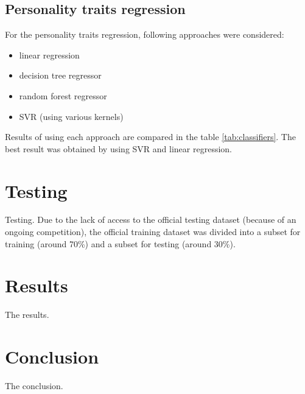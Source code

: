 \documentclass[10pt, a4paper]{article}
\begin{document}
\subsection{Personality traits regression}
For the personality traits regression, following approaches were considered:
\begin{itemize}
	\item linear regression
	\item decision tree regressor
	\item random forest regressor
	\item SVR (using various kernels)
\end{itemize}
\noindent Results of using each approach are compared in the table \ref{tab:classifiers}. The best result was obtained by using SVR and linear regression.


\section{Testing}
Testing.
Due to the lack of access to the official testing dataset (because of an ongoing competition), the official training dataset was divided into a subset for training (around 70\%) and a subset for testing (around 30\%).

\section{Results}
\label{sec:results}
The results.

\section{Conclusion}
The conclusion.
\end{document}
